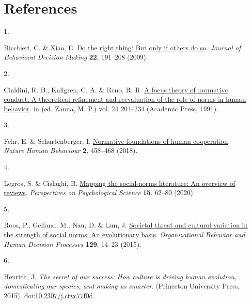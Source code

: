 \documentclass[
  man, donotrepeattitle,floatsintext]{apa6}
\newlength{\cslhangindent}
\newlength{\csllabelwidth}
\newlength{\cslentryspacingunit} %
\newenvironment{CSLReferences}[2] %
 {%
  \setlength{\parindent}{0pt}
  \ifodd #1
  \let\oldpar\par
  \def\par{\hangindent=\cslhangindent\oldpar}
  \fi
  \setlength{\parskip}{#2\cslentryspacingunit}
 }%
 {}
\newcommand{\CSLLeftMargin}[1]{\parbox[t]{\csllabelwidth}{#1}}
\newcommand{\CSLRightInline}[1]{\parbox[t]{\linewidth - \csllabelwidth}{#1}\break}
\begin{document}
\hypertarget{references}{%
\section{References}\label{references}}

\begingroup

\hypertarget{refs}{}
\begin{CSLReferences}{0}{0}
\leavevmode{}%
\CSLLeftMargin{1. }%
\CSLRightInline{Bicchieri, C. \& Xiao, E. \href{https://doi.org/10.1002/bdm.621}{Do the right thing: But only if others do so}. \emph{Journal of Behavioral Decision Making} \textbf{22}, 191--208 (2009).}

\leavevmode{}%
\CSLLeftMargin{2. }%
\CSLRightInline{Cialdini, R. B., Kallgren, C. A. \& Reno, R. R. \href{https://doi.org/10.1016/S0065-2601(08)60330-5}{A focus theory of normative conduct: A theoretical refinement and reevaluation of the role of norms in human behavior}. in (ed. Zanna, M. P.) vol. 24 201--234 (Academic Press, 1991).}

\leavevmode{}%
\CSLLeftMargin{3. }%
\CSLRightInline{Fehr, E. \& Schurtenberger, I. \href{https://doi.org/10.1038/s41562-018-0385-5}{Normative foundations of human cooperation}. \emph{Nature Human Behaviour} \textbf{2}, 458--468 (2018).}

\leavevmode{}%
\CSLLeftMargin{4. }%
\CSLRightInline{Legros, S. \& Cislaghi, B. \href{https://doi.org/10.1177/1745691619866455}{Mapping the social-norms literature: An overview of reviews}. \emph{Perspectives on Psychological Science} \textbf{15}, 62--80 (2020).}

\leavevmode{}%
\CSLLeftMargin{5. }%
\CSLRightInline{Roos, P., Gelfand, M., Nau, D. \& Lun, J. \href{https://doi.org/10.1016/j.obhdp.2015.01.003}{Societal threat and cultural variation in the strength of social norms: An evolutionary basis}. \emph{Organizational Behavior and Human Decision Processes} \textbf{129}, 14--23 (2015).}

\leavevmode{}%
\CSLLeftMargin{6. }%
\CSLRightInline{Henrich, J. \emph{The secret of our success: How culture is driving human evolution, domesticating our species, and making us smarter}. (Princeton University Press, 2015). doi:\href{https://doi.org/10.2307/j.ctvc77f0d}{10.2307/j.ctvc77f0d}.}


\end{CSLReferences}
\end{document}
